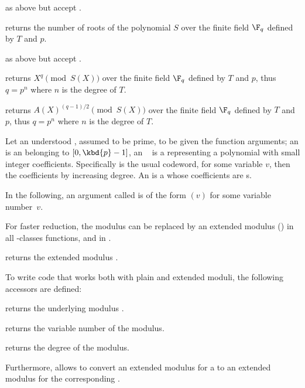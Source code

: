  as above but accept .

 returns the number of roots of
the polynomial $S$ over the finite field $\F_q$ defined by $T$ and $p$.

 as above but accept .

 returns
$X^{q}\pmod{S(X)}$ over the finite field $\F_q$ defined by $T$ and $p$, thus
$q=p^n$ where $n$ is the degree of $T$.

 returns
$A(X)^{(q-1)/2}\pmod{S(X)}$ over the finite field $\F_q$ defined by $T$
and $p$, thus $q=p^n$ where $n$ is the degree of $T$.

 Let  an understood , assumed to be
prime, to be given the function arguments; an  is an 
belonging to $[0,\kbd{p}-1]$, an ~ is a 
representing a polynomial with small integer coefficients. Specifically
 is the usual codeword,  for some
variable $v$, then the coefficients by increasing degree. An  is a
 whose coefficients are s.

\noindent In the following, an argument called  is of the form
$(v)$ for some variable number~$v$.


For faster reduction, the modulus  can be replaced by an extended
modulus () in all -classes functions, and in
.

 returns the extended modulus .

To write code that works both with plain and extended moduli, the following
accessors are defined:

 returns the underlying modulus .

 returns the variable number of the modulus.

 returns the degree of the modulus.

Furthermore,  allows to convert an extended modulus for
a  to an extended modulus for the corresponding .

